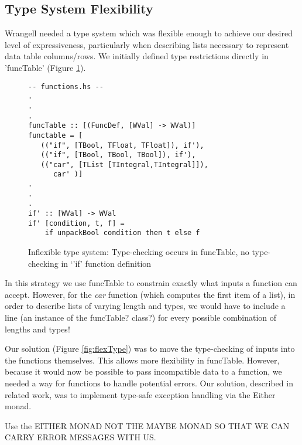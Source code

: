 \documentclass[preprint,nocopyrightspace]{sig-alternate}
\begin{document}
\subsection{Type System Flexibility}
Wrangell needed a type system which was flexible enough to achieve our desired level of expressiveness, particularly when describing lists necessary to represent data table columns/rows. We initially defined type restrictions directly in 'funcTable' (Figure \ref{fig:inflexType}).
\begin{figure}
\caption{Inflexible type system: Type-checking occurs in funcTable, no type-checking in `'if' function definition}
\begin{lstlisting}
-- functions.hs --
.
.
.
funcTable :: [(FuncDef, [WVal] -> WVal)] 
functable = [
   (("if", [TBool, TFloat, TFloat]), if'),
   (("if", [TBool, TBool, TBool]), if'),
   (("car", [TList [TIntegral,TIntegral]]), 
      car' )]    
.
.
.          
if' :: [WVal] -> WVal
if' [condition, t, f] = 
    if unpackBool condition then t else f

\end{lstlisting}
\label{fig:inflexType}
\end{figure}
In this strategy we use funcTable to constrain exactly what inputs a function can accept. However, for the \emph{car} function (which computes the first item of a list), in order to describe lists of varying length and types, we would have to include a line (an instance of the funcTable? class?) for every possible combination of lengths and types!

Our solution (Figure \ref{fig:flexType}) was to move the type-checking of inputs into the functions themselves. This allows more flexibility in funcTable. However, because it would now be possible to pass incompatible data to a function, we needed a way for functions to handle potential errors. Our solution, described in related work, was to implement type-safe exception handling via the Either monad. 

Use the EITHER MONAD NOT THE MAYBE MONAD SO THAT WE CAN CARRY ERROR MESSAGES WITH US. 
\end{document}
